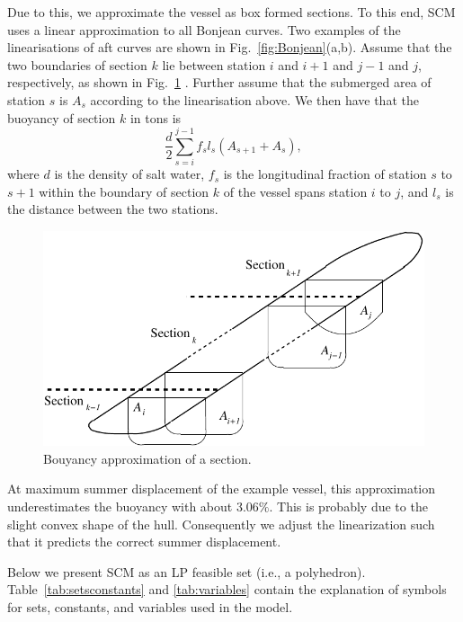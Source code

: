 \documentclass[runningheads]{llncs}
\begin{document}
Due to this, we approximate the vessel as box formed sections. To this end, SCM uses a linear approximation to all Bonjean curves. Two examples of the linearisations of aft curves are shown in Fig.~\ref{fig:Bonjean}(a,b). Assume that the two boundaries of section $k$ lie between station $i$ and $i+1$ and $j-1$ and $j$, respectively, as shown in Fig.~\ref{fig:Bapprox} . Further assume that the submerged area of station $s$ is $A_s$ according to the linearisation above. We then have that the buoyancy of section $k$ in tons is 
\begin{equation}
\frac{d}{2} \sum_{s=i}^{j-1} f_s l_s (A_{s+1} + A_{s}), \label{eq:area}    
\end{equation}
where $d$ is the density of salt water, $f_s$ is the longitudinal fraction of station $s$ to $s+1$ within the boundary of section $k$  
of the vessel spans station $i$ to $j$, and $l_s$ is the distance between the two stations.
\begin{figure}[h!]
\begin{center}
  \includegraphics[scale=0.5]{figures/BouyancyApprox}
\end{center}
\caption{Bouyancy approximation of a section.}
\label{fig:Bapprox}
\end{figure}

At maximum summer displacement of the example vessel, this approximation underestimates the buoyancy with about $3.06\%$. This is probably due to the slight convex shape of the hull. Consequently we adjust the linearization such that it predicts the correct summer displacement. 

Below we present SCM as an LP feasible set (i.e., a polyhedron). Table~\ref{tab:setsconstants} and \ref{tab:variables} contain the explanation of symbols for sets, constants, and variables used in the model. 
\end{document}
